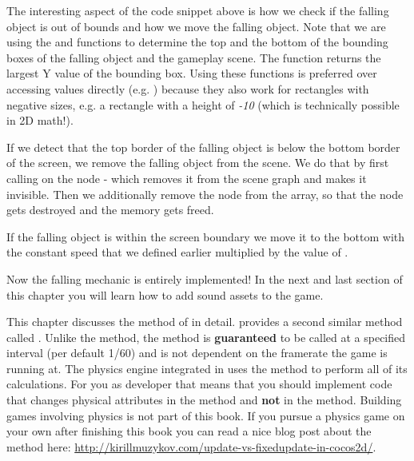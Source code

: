The interesting aspect of the code snippet above is how we check if the
falling object is out of bounds and how we move the falling object. Note that we
are using the  and 
functions to determine the top and the bottom of the bounding boxes of the
falling object and the gameplay scene. The  function
returns the largest Y value of the bounding box. Using these functions is preferred over accessing values
directly (e.g. ) because they
also work for rectangles with negative sizes, e.g. a rectangle with a height of
\textit{-10} (which is technically possible in 2D math!).

If we detect that the top border of the falling object is below the bottom
border of the screen, we remove the falling object from the scene. We do that by
first calling  on the node - which removes it from
the scene graph and makes it invisible. Then we additionally remove the node
from the  array, so that the node gets destroyed and
the memory gets freed.

If the falling object is within the screen boundary we move it to the bottom
with the constant speed that we defined earlier multiplied by the value of
.

Now the falling mechanic is entirely implemented! In the next and last
section of this chapter you will learn how to add sound assets to the game.

\begin{details} 
This chapter discusses the  method of \cocos{} in detail.
\cocos{} provides a second similar method called
.
Unlike the  method, the  method is
\textbf{guaranteed} to be called at a specified interval (per default 1/60) and
is not dependent on the framerate the game is running at. The physics engine
integrated in \cocos{} uses the
 method to perform all of its calculations. For you as
developer that means that you should implement code that changes physical
attributes in the  method and \textbf{not} in the
 method. Building games involving physics is not part of
this book. If you pursue a physics game on your own after finishing this book
you can read a nice blog post about the  method here:
\url{http://kirillmuzykov.com/update-vs-fixedupdate-in-cocos2d/}.
\end{details}


